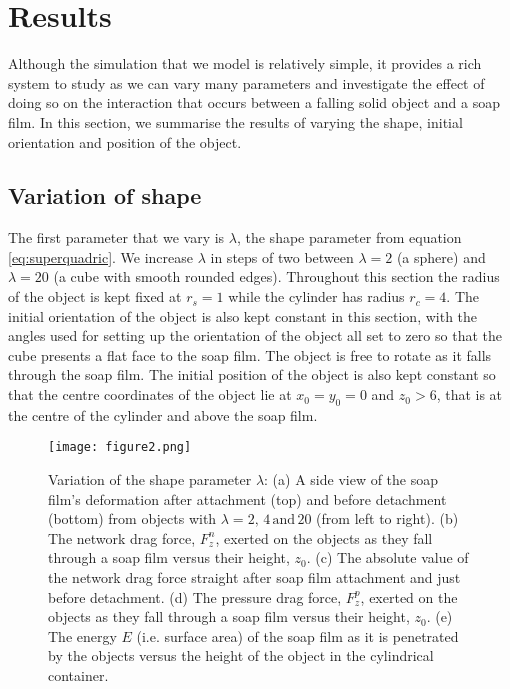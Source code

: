\documentclass[preprint]{revtex4-1}
\begin{document}
\section{Results}
 \label{sec:results}


Although the simulation that we model is relatively simple, it provides a rich system to study as we can vary many parameters and investigate the effect of doing so on the interaction that occurs between a falling solid object and a soap film. In this section, we summarise the results of varying the shape, initial orientation and position of the object. 

\subsection{Variation of shape}
	\label{sec:shape}


The first parameter that we vary is $\lambda$, the shape parameter from equation \ref{eq:superquadric}. We increase $\lambda$ in steps of two between $\lambda=2$ (a sphere) and $\lambda=20$ (a cube with smooth rounded edges). Throughout this section the radius of the object is kept fixed at $r_s=1$ while the cylinder has radius $r_c=4$. The initial orientation of the object is also kept constant in this section, with the angles used for setting up the orientation of the object all set to zero so that the cube presents a flat face to the soap film. The object is free to rotate as it falls through the soap film. The initial position of the object is also kept constant so that the centre coordinates of the object lie at $x_0=y_0=0$ and $z_0>6$, that is at the centre of the cylinder and above the soap film. 

\begin{figure}
  \centering
		\texttt{[image: figure2.png]}
  \caption{Variation of the shape parameter $\lambda$: (a) A side view of the soap film's deformation after attachment (top) and before detachment (bottom) from objects with $\lambda=2,\,4\,\mbox{and}\,20$ (from left to right). (b) The network drag force, $F_z^n$,  exerted on the objects as they fall through a soap film versus their height, $z_0$. (c) The absolute value of the network drag force straight after soap film attachment and just before detachment. (d) The pressure drag force, $F_z^p$,  exerted on the objects as they fall through a soap film versus their height, $z_0$. (e) The energy $E$ (i.e. surface area) of the soap film as it is penetrated by the objects versus the height of the object in the cylindrical container.}
  \label{fig:shape_variation}
\end{figure} 
\end{document}
